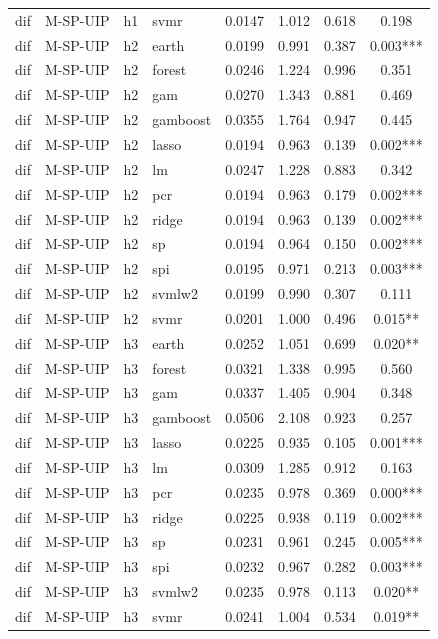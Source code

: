 \begin{ThreePartTable}
\begin{longtable}[t]{llclcccc}
dif & M-SP-UIP & h1 & svmr & 0.0147 & 1.012 & 0.618 & 0.198\\
\addlinespace
dif & M-SP-UIP & h2 & earth & 0.0199 & 0.991 & 0.387 & 0.003***\\
dif & M-SP-UIP & h2 & forest & 0.0246 & 1.224 & 0.996 & 0.351\\
dif & M-SP-UIP & h2 & gam & 0.0270 & 1.343 & 0.881 & 0.469\\
dif & M-SP-UIP & h2 & gamboost & 0.0355 & 1.764 & 0.947 & 0.445\\
dif & M-SP-UIP & h2 & lasso & 0.0194 & 0.963 & 0.139 & 0.002***\\
dif & M-SP-UIP & h2 & lm & 0.0247 & 1.228 & 0.883 & 0.342\\
dif & M-SP-UIP & h2 & pcr & 0.0194 & 0.963 & 0.179 & 0.002***\\
dif & M-SP-UIP & h2 & ridge & 0.0194 & 0.963 & 0.139 & 0.002***\\
dif & M-SP-UIP & h2 & sp & 0.0194 & 0.964 & 0.150 & 0.002***\\
dif & M-SP-UIP & h2 & spi & 0.0195 & 0.971 & 0.213 & 0.003***\\
dif & M-SP-UIP & h2 & svmlw2 & 0.0199 & 0.990 & 0.307 & 0.111\\
dif & M-SP-UIP & h2 & svmr & 0.0201 & 1.000 & 0.496 & 0.015**\\
\addlinespace
dif & M-SP-UIP & h3 & earth & 0.0252 & 1.051 & 0.699 & 0.020**\\
dif & M-SP-UIP & h3 & forest & 0.0321 & 1.338 & 0.995 & 0.560\\
dif & M-SP-UIP & h3 & gam & 0.0337 & 1.405 & 0.904 & 0.348\\
dif & M-SP-UIP & h3 & gamboost & 0.0506 & 2.108 & 0.923 & 0.257\\
dif & M-SP-UIP & h3 & lasso & 0.0225 & 0.935 & 0.105 & 0.001***\\
dif & M-SP-UIP & h3 & lm & 0.0309 & 1.285 & 0.912 & 0.163\\
dif & M-SP-UIP & h3 & pcr & 0.0235 & 0.978 & 0.369 & 0.000***\\
dif & M-SP-UIP & h3 & ridge & 0.0225 & 0.938 & 0.119 & 0.002***\\
dif & M-SP-UIP & h3 & sp & 0.0231 & 0.961 & 0.245 & 0.005***\\
dif & M-SP-UIP & h3 & spi & 0.0232 & 0.967 & 0.282 & 0.003***\\
dif & M-SP-UIP & h3 & svmlw2 & 0.0235 & 0.978 & 0.113 & 0.020**\\
dif & M-SP-UIP & h3 & svmr & 0.0241 & 1.004 & 0.534 & 0.019**\\

\end{longtable}
\end{ThreePartTable}
